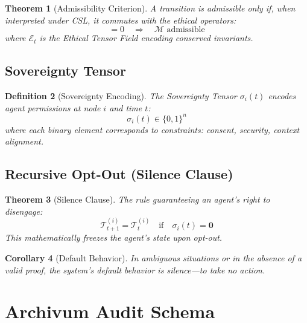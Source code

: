 \documentclass[11pt,a4paper]{article}
\newtheorem{theorem}{Theorem}[section]
\newtheorem{corollary}[theorem]{Corollary}
\newtheorem{definition}[theorem]{Definition}
\newcommand{\Tensor}[1]{\mathcal{T}_{#1}}
\newcommand{\EthicalField}{\mathcal{E}_t}
\newcommand{\SovereigntyTensor}{\sigma_i(t)}
\newcommand{\Commutator}[2]{[#1, #2]}
\begin{document}
\begin{theorem}[Admissibility Criterion]
A transition is admissible only if, when interpreted under CSL, it commutes with the ethical operators:
\begin{equation}
    \Commutator{\mathcal{M}}{\EthicalField} = 0 \quad \Longrightarrow \quad \mathcal{M} \text{ admissible}
    \label{eq:csl_commutation}
\end{equation}
where $\EthicalField$ is the Ethical Tensor Field encoding conserved invariants.
\end{theorem}

\subsection{Sovereignty Tensor}

\begin{definition}[Sovereignty Encoding]
The Sovereignty Tensor $\SovereigntyTensor$ encodes agent permissions at node $i$ and time $t$:
\begin{equation}
    \SovereigntyTensor \in \{0, 1\}^n
    \label{eq:sovereignty_tensor}
\end{equation}
where each binary element corresponds to constraints: consent, security, context alignment.
\end{definition}

\subsection{Recursive Opt-Out (Silence Clause)}

\begin{theorem}[Silence Clause]
The rule guaranteeing an agent's right to disengage:
\begin{equation}
    \Tensor{t+1}^{(i)} = \Tensor{t}^{(i)} \quad \text{if} \quad \SovereigntyTensor = \mathbf{0}
    \label{eq:silence_clause}
\end{equation}
This mathematically freezes the agent's state upon opt-out.
\end{theorem}

\begin{corollary}[Default Behavior]
In ambiguous situations or in the absence of a valid proof, the system's default behavior is \emph{silence}---to take no action.
\end{corollary}

\section{Archivum Audit Schema}
\end{document}
